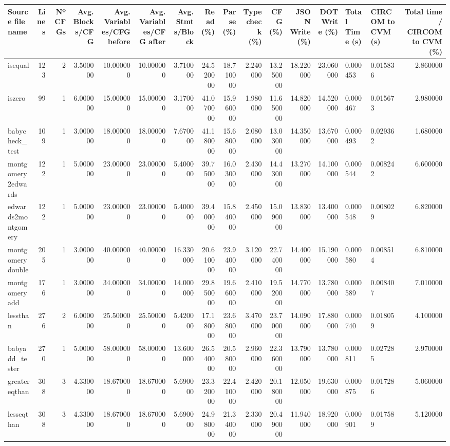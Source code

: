 \begin{tabular}{lrrrrrrrrrrrrllr}
\toprule
Source file name & Lines & Nº CFGs & Avg. Blocks/CFG & Avg. Variables/CFG before & Avg. Variables/CFG after & Avg. Stmts/Block & Read (\%) & Parse (\%) & Typecheck (\%) & CFG (\%) & JSON Write (\%) & DOT Write (\%) & Total Time (s) & CIRCOM to CVM (s) & Total time / CIRCOM to CVM (\%) \\
\midrule
isequal & 123 & 2 & 3.500000 & 10.000000 & 10.000000 & 3.710000 & 24.520000 & 18.710000 & 2.240000 & 13.250000 & 18.220000 & 23.060000 & 0.000453 & 0.015836 & 2.860000 \\
iszero & 99 & 1 & 6.000000 & 15.000000 & 15.000000 & 3.170000 & 41.070000 & 15.960000 & 1.980000 & 11.650000 & 14.820000 & 14.520000 & 0.000467 & 0.015673 & 2.980000 \\
babycheck\_test & 109 & 1 & 3.000000 & 18.000000 & 18.000000 & 7.670000 & 41.180000 & 15.680000 & 2.080000 & 13.030000 & 14.350000 & 13.670000 & 0.000493 & 0.029362 & 1.680000 \\
montgomery2edwards & 122 & 1 & 5.000000 & 23.000000 & 23.000000 & 5.400000 & 39.750000 & 16.030000 & 2.430000 & 14.430000 & 13.270000 & 14.100000 & 0.000544 & 0.008242 & 6.600000 \\
edwards2montgomery & 122 & 1 & 5.000000 & 23.000000 & 23.000000 & 5.400000 & 39.400000 & 15.840000 & 2.450000 & 15.090000 & 13.830000 & 13.400000 & 0.000548 & 0.008029 & 6.820000 \\
montgomerydouble & 205 & 1 & 3.000000 & 40.000000 & 40.000000 & 16.330000 & 20.610000 & 23.940000 & 3.120000 & 22.740000 & 14.400000 & 15.190000 & 0.000580 & 0.008514 & 6.810000 \\
montgomeryadd & 176 & 1 & 3.000000 & 34.000000 & 34.000000 & 14.000000 & 29.850000 & 19.660000 & 2.410000 & 19.520000 & 14.770000 & 13.780000 & 0.000589 & 0.008407 & 7.010000 \\
lessthan & 276 & 2 & 6.000000 & 25.500000 & 25.500000 & 5.420000 & 17.180000 & 23.680000 & 3.470000 & 23.700000 & 14.090000 & 17.880000 & 0.000740 & 0.018059 & 4.100000 \\
babyadd\_tester & 270 & 1 & 5.000000 & 58.000000 & 58.000000 & 13.600000 & 26.540000 & 20.580000 & 2.960000 & 22.360000 & 13.790000 & 13.780000 & 0.000811 & 0.027285 & 2.970000 \\
greatereqthan & 308 & 3 & 4.330000 & 18.670000 & 18.670000 & 5.690000 & 23.320000 & 22.410000 & 2.420000 & 20.180000 & 12.050000 & 19.630000 & 0.000875 & 0.017286 & 5.060000 \\
lesseqthan & 308 & 3 & 4.330000 & 18.670000 & 18.670000 & 5.690000 & 24.980000 & 21.340000 & 2.330000 & 20.490000 & 11.940000 & 18.920000 & 0.000901 & 0.017589 & 5.120000 \\

\end{tabular}
